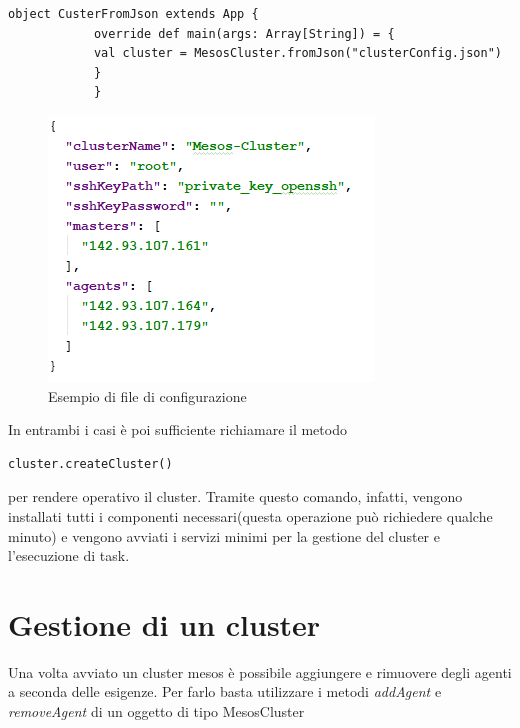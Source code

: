 \documentclass[12pt,a4paper]{article}
\begin{document}
\begin{enumerate}
\begin{lstlisting}[style=myScalastyle]
            object CusterFromJson extends App {
            override def main(args: Array[String]) = {
            val cluster = MesosCluster.fromJson("clusterConfig.json")
            }
            }
        \end{lstlisting}
        \begin{figure}[h!]
            \includegraphics[scale=1]{res/esempio_json.png}
            \caption{Esempio di file di configurazione}
            \label{fig1json}
        \end{figure}

    \end{enumerate}
    In entrambi i casi \`e poi sufficiente richiamare il metodo
    \begin{lstlisting}[style=myScalastyle]
        cluster.createCluster()
    \end{lstlisting}
    per rendere operativo il cluster. Tramite questo comando, infatti, vengono installati tutti i componenti necessari(questa operazione pu\`o richiedere qualche minuto) e vengono avviati i servizi minimi per la gestione del cluster e l'esecuzione di task.



    \section{Gestione di un cluster}\label{sec:gestioneCluster}

    Una volta avviato un cluster mesos \`e possibile aggiungere e rimuovere degli agenti a seconda delle esigenze.
    Per farlo basta utilizzare i metodi \textit{addAgent} e \textit{removeAgent} di un oggetto di tipo MesosCluster
\end{document}
